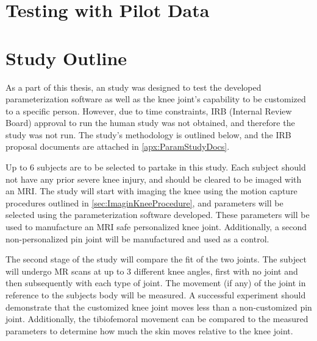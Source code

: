 \section{Testing with Pilot Data}




\section{Study Outline}

As a part of this thesis, an study was designed to test the developed parameterization software as well as the knee joint's capability to be customized to a specific person. However, due to time constraints, IRB (Internal Review Board) approval to run the human study was not obtained, and therefore the study was not run. The study's methodology is outlined below, and the IRB proposal documents are attached in \autoref{apx:ParamStudyDocs}.

Up to 6 subjects are to be selected to partake in this study. Each subject should not have any prior severe knee injury, and should be cleared to be imaged with an MRI. The study will start with imaging the knee using the motion capture procedures outlined in \autoref{sec:ImaginKneeProcedure}, and parameters will be selected using the parameterization software developed. These parameters will be used to manufacture an MRI safe personalized knee joint. Additionally, a second non-personalized pin joint will be manufactured and used as a control.

The second stage of the study will compare the fit of the two joints. The subject will undergo MR scans at up to 3 different knee angles, first with no joint and then subsequently with each type of joint. The movement (if any) of the joint in reference to the subjects body will be measured. A successful experiment should demonstrate that the customized knee joint moves less than a non-customized pin joint. Additionally, the tibiofemoral movement can be compared to the measured parameters to determine how much the skin moves relative to the knee joint.
